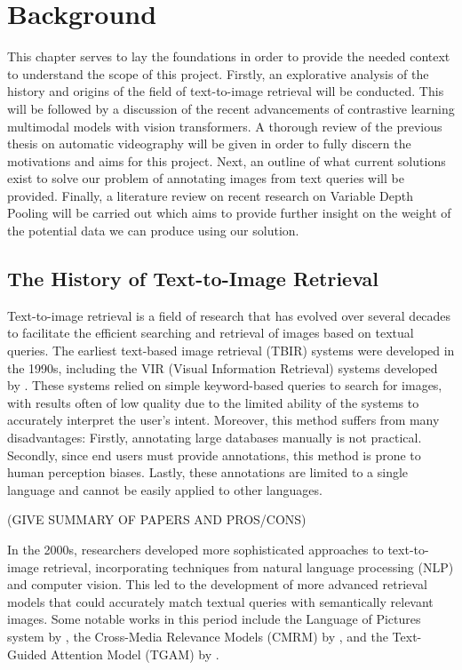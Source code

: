 \documentclass{l4proj}
\begin{document}
\chapter{Background}
This chapter serves to lay the foundations in order to provide the needed context to understand the scope of this project. Firstly, an explorative analysis of the history and origins of the field of text-to-image retrieval will be conducted. This will be followed by a discussion of the recent advancements of contrastive learning multimodal models with vision transformers. A thorough review of the previous thesis on automatic videography will be given in order to fully discern the motivations and aims for this project. Next, an outline of what current solutions exist to solve our problem of annotating images from text queries will be provided. Finally, a literature review on recent research on Variable Depth Pooling will be carried out which aims to provide further insight on the weight of the potential data we can produce using our solution.

\section{The History of Text-to-Image Retrieval}
Text-to-image retrieval is a field of research that has evolved over several decades to facilitate the efficient searching and retrieval of images based on textual queries. The earliest text-based image retrieval (TBIR) systems were developed in the 1990s, including the VIR (Visual Information Retrieval) systems developed by \cite{datta2001cbir}. These systems relied on simple keyword-based queries to search for images, with results often of low quality due to the limited ability of the systems to accurately interpret the user's intent. Moreover, this method suffers from many disadvantages: Firstly, annotating large databases manually is not practical. Secondly, since end users must provide annotations, this method is prone to human perception biases. Lastly, these annotations are limited to a single language and cannot be easily applied to other languages.

(GIVE SUMMARY OF PAPERS AND PROS/CONS)

In the 2000s, researchers developed more sophisticated approaches to text-to-image retrieval, incorporating techniques from natural language processing (NLP) and computer vision. This led to the development of more advanced retrieval models that could accurately match textual queries with semantically relevant images. Some notable works in this period include the Language of Pictures system by \cite{lavrenko2003lop}, the Cross-Media Relevance Models (CMRM) by \cite{rasiwasia2010cmmr}, and the Text-Guided Attention Model (TGAM) by \cite{gao2018tgam}.
\end{document}
